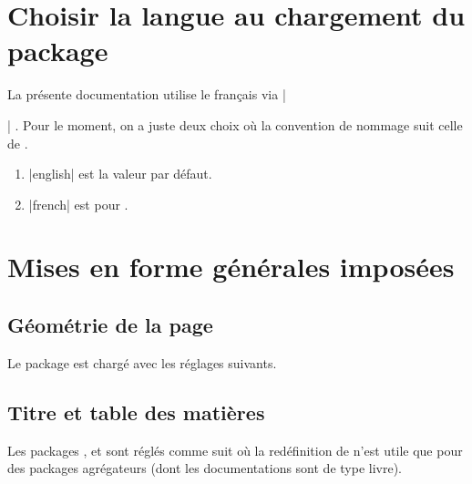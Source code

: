 \documentclass[12pt, a4paper]{article}
\begin{document}
\section{Choisir la langue au chargement du package}

La présente documentation utilise le français via \bdocinlatex|\usepackage[lang = french]{bdoc}| .
Pour le moment, on a juste deux choix où la convention de nommage suit celle de .

\begin{enumerate}
    \item \bdocinlatex|english| est la valeur par défaut.

    \item \bdocinlatex|french| est pour .
\end{enumerate}


\section{Mises en forme générales imposées}

\subsection{Géométrie de la page}

Le package  est chargé avec les réglages suivants.

\begin{bdoclatex}[code]
\RequirePackage[
  top            = 2.5cm,
  bottom         = 2.5cm,
  left           = 2.5cm,
  right          = 2.5cm,
  marginparwidth = 2cm,
  marginparsep   = 2mm,
  heightrounded
]{geometry}
\end{bdoclatex}



\subsection{Titre et table des matières}

Les packages ,  et  sont réglés comme suit où la redéfinition de  n'est utile que pour des packages agrégateurs (dont les documentations sont de type livre).
\end{document}

